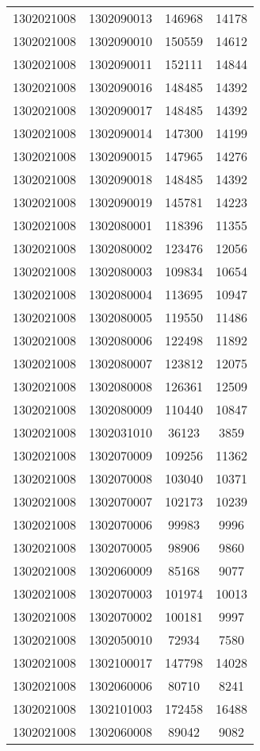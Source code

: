 \begin{longtable}{llcc}
1302021008 & 1302090013 & 146968 & 14178\\
1302021008 & 1302090010 & 150559 & 14612\\
1302021008 & 1302090011 & 152111 & 14844\\
1302021008 & 1302090016 & 148485 & 14392\\
1302021008 & 1302090017 & 148485 & 14392\\
1302021008 & 1302090014 & 147300 & 14199\\
1302021008 & 1302090015 & 147965 & 14276\\
1302021008 & 1302090018 & 148485 & 14392\\
1302021008 & 1302090019 & 145781 & 14223\\
1302021008 & 1302080001 & 118396 & 11355\\
1302021008 & 1302080002 & 123476 & 12056\\
1302021008 & 1302080003 & 109834 & 10654\\
1302021008 & 1302080004 & 113695 & 10947\\
1302021008 & 1302080005 & 119550 & 11486\\
1302021008 & 1302080006 & 122498 & 11892\\
1302021008 & 1302080007 & 123812 & 12075\\
1302021008 & 1302080008 & 126361 & 12509\\
1302021008 & 1302080009 & 110440 & 10847\\
1302021008 & 1302031010 & 36123 & 3859\\
1302021008 & 1302070009 & 109256 & 11362\\
1302021008 & 1302070008 & 103040 & 10371\\
1302021008 & 1302070007 & 102173 & 10239\\
1302021008 & 1302070006 & 99983 & 9996\\
1302021008 & 1302070005 & 98906 & 9860\\
1302021008 & 1302060009 & 85168 & 9077\\
1302021008 & 1302070003 & 101974 & 10013\\
1302021008 & 1302070002 & 100181 & 9997\\
1302021008 & 1302050010 & 72934 & 7580\\
1302021008 & 1302100017 & 147798 & 14028\\
1302021008 & 1302060006 & 80710 & 8241\\
1302021008 & 1302101003 & 172458 & 16488\\
1302021008 & 1302060008 & 89042 & 9082\\

\end{longtable}
